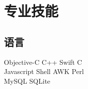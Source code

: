 \documentclass[]{deedy-resume-document-class}
\begin{document}
\begin{minipage}[t]{0.33\textwidth}
%


\section{专业技能}
\subsection{语言}
Objective-C \textbullet{}  C++ \textbullet{} Swift \textbullet{} C  \\
Javascript \textbullet{} Shell \textbullet{} AWK \textbullet{} Perl \\ 

MySQL \textbullet{}   SQLite \\ 


\end{minipage}
\end{document}
